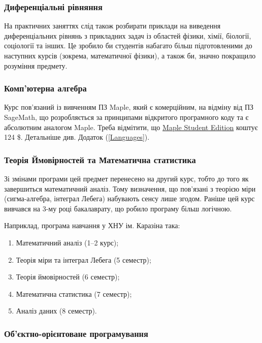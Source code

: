 \documentclass[14pt, a4paper]{extarticle}  %
\begin{document}
\subsubsection{Диференціальні рівняння}

На практичних заняттях слід також розбирати приклади на виведення диференціальних рівнянь з прикладних задач із областей фізики, хімії, біології, соціології та інших. Це зробило би студентів набагато більш підготовленими до наступних курсів (зокрема, математичної фізики), а також би, значно покращило розуміння предмету.

\subsubsection{Комп'ютерна алгебра}

Курс пов'язаний із вивченням ПЗ Maple, який є комерційним, на відміну від ПЗ SageMath, що розробляється за принципами відкритого програмного коду та є абсолютним аналогом Maple. Треба відмітити, що \href{https://webstore.maplesoft.com/catalog.aspx}{Maple Student Edition} коштує 124 \$. Детальніше див. Додаток (\ref{Languages}). 

\subsubsection{Теорія Ймовірностей та Математична статистика}

Зі змінами програми цей предмет перенесено на другий курс, тобто до того як завершиться математичний аналіз. Тому визначення, що пов'язані з теорією міри (сигма-алгебра, інтеграл Лебега) набувають сенсу лише згодом. Раніше цей курс вивчався на 3-му році бакалаврату, що робило програму більш логічною. 

Наприклад, програма навчання у ХНУ ім. Каразіна така:
\begin{enumerate}
    \item Математичний аналіз (1--2 курс);
    \item Теорія міри та інтеграл Лебега (5 семестр);
    \item Теорія ймовірностей (6 семестр);
    \item Математична статистика (7 семестр);
    \item Аналіз даних (8 семестр).
\end{enumerate}

\subsubsection{Об'єктно-орієнтоване програмування}
\end{document}
